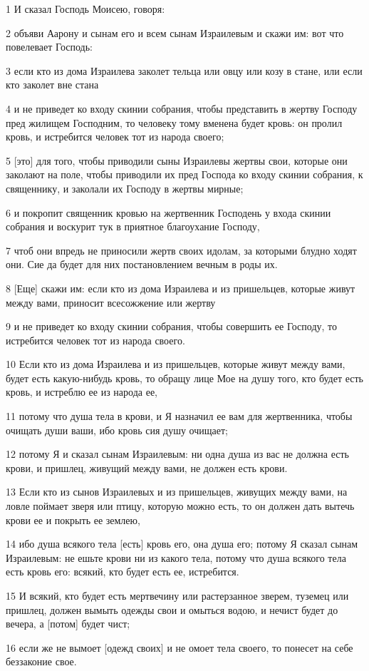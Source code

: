 \par 1 И сказал Господь Моисею, говоря:
\par 2 объяви Аарону и сынам его и всем сынам Израилевым и скажи им: вот что повелевает Господь:
\par 3 если кто из дома Израилева заколет тельца или овцу или козу в стане, или если кто заколет вне стана
\par 4 и не приведет ко входу скинии собрания, чтобы представить в жертву Господу пред жилищем Господним, то человеку тому вменена будет кровь: он пролил кровь, и истребится человек тот из народа своего;
\par 5 [это] для того, чтобы приводили сыны Израилевы жертвы свои, которые они заколают на поле, чтобы приводили их пред Господа ко входу скинии собрания, к священнику, и заколали их Господу в жертвы мирные;
\par 6 и покропит священник кровью на жертвенник Господень у входа скинии собрания и воскурит тук в приятное благоухание Господу,
\par 7 чтоб они впредь не приносили жертв своих идолам, за которыми блудно ходят они. Сие да будет для них постановлением вечным в роды их.
\par 8 [Еще] скажи им: если кто из дома Израилева и из пришельцев, которые живут между вами, приносит всесожжение или жертву
\par 9 и не приведет ко входу скинии собрания, чтобы совершить ее Господу, то истребится человек тот из народа своего.
\par 10 Если кто из дома Израилева и из пришельцев, которые живут между вами, будет есть какую-нибудь кровь, то обращу лице Мое на душу того, кто будет есть кровь, и истреблю ее из народа ее,
\par 11 потому что душа тела в крови, и Я назначил ее вам для жертвенника, чтобы очищать души ваши, ибо кровь сия душу очищает;
\par 12 потому Я и сказал сынам Израилевым: ни одна душа из вас не должна есть крови, и пришлец, живущий между вами, не должен есть крови.
\par 13 Если кто из сынов Израилевых и из пришельцев, живущих между вами, на ловле поймает зверя или птицу, которую можно есть, то он должен дать вытечь крови ее и покрыть ее землею,
\par 14 ибо душа всякого тела [есть] кровь его, она душа его; потому Я сказал сынам Израилевым: не ешьте крови ни из какого тела, потому что душа всякого тела есть кровь его: всякий, кто будет есть ее, истребится.
\par 15 И всякий, кто будет есть мертвечину или растерзанное зверем, туземец или пришлец, должен вымыть одежды свои и омыться водою, и нечист будет до вечера, а [потом] будет чист;
\par 16 если же не вымоет [одежд своих] и не омоет тела своего, то понесет на себе беззаконие свое.

